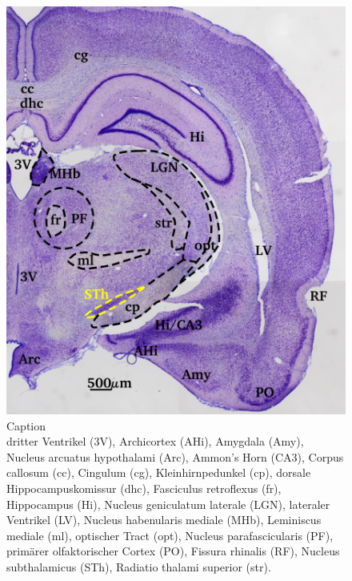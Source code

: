 \documentclass[12pt,a4paper,pdftex]{article}
\begin{document}
\begin{figure}[H]
    \centering
    \includegraphics{pictures/Basalganglia/Nucleus_subthalamus.png}
    \caption{Caption\\
    dritter Ventrikel (3V), Archicortex (AHi), Amygdala (Amy), Nucleus arcuatus hypothalami (Arc), Ammon's Horn (CA3), Corpus callosum (cc), Cingulum (cg), Kleinhirnpedunkel (cp), dorsale Hippocampuskomissur (dhc), Fasciculus retroflexus (fr), Hippocampus (Hi), Nucleus geniculatum laterale (LGN), lateraler Ventrikel (LV), Nucleus habenularis mediale (MHb), Leminiscus mediale (ml), optischer Tract (opt), Nucleus parafascicularis (PF),  primärer  olfaktorischer  Cortex (PO), Fissura rhinalis (RF), Nucleus subthalamicus (STh), Radiatio thalami superior (str).}
    \label{fig:Nucleus_subthalamus}
\end{figure}
\end{document}
